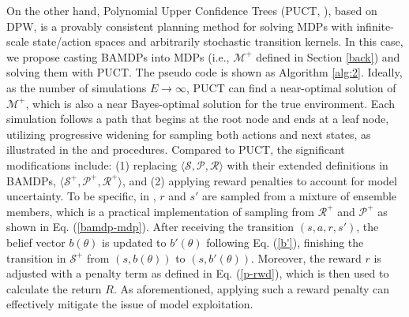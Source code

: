 On the other hand, Polynomial Upper Confidence Trees (PUCT, \cite{DBLP:conf/pkdd/AugerCT13}), based on DPW, is a provably consistent planning method for solving MDPs with infinite-scale state/action spaces and arbitrarily stochastic transition kernels.
In this case, we propose casting BAMDPs into MDPs (i.e., $\mathcal{M}^+$ defined in Section \ref{back}) and solving them with PUCT. The pseudo code is shown as Algorithm \ref{alg:2}. Ideally, as the number of simulations $E \rightarrow \infty$, PUCT can find a near-optimal solution of $\mathcal{M}^+$, which is also a near Bayes-optimal solution for the true environment. Each simulation follows a path that begins at the root node and ends at a leaf node, utilizing progressive widening for sampling both actions and next states, as illustrated in the  and  procedures. Compared to PUCT, the significant modifications include: (1) replacing \(\langle \mathcal{S}, \mathcal{P}, \mathcal{R} \rangle\) with their extended definitions in BAMDPs, \(\langle \mathcal{S}^+, \mathcal{P}^+, \mathcal{R}^+ \rangle\), and (2) applying reward penalties to account for model uncertainty. To be specific, in , $r$ and $s'$ are sampled from a mixture of ensemble members, which is a practical implementation of sampling from $\mathcal{R}^+$ and $\mathcal{P}^+$ as shown in Eq. (\ref{bamdp-mdp}). After receiving the transition $(s, a, r, s')$, the belief vector $b(\theta)$ is updated to $b'(\theta)$ following Eq. (\ref{b'}), finishing the transition in $\mathcal{S}^+$ from $(s, b(\theta))$ to $(s, b'(\theta))$. Moreover, the reward \(r\) is adjusted with a penalty term as defined in Eq. (\ref{p-rwd}), which is then used to calculate the return \(R\). As aforementioned, applying such a reward penalty can effectively mitigate the issue of model exploitation.
